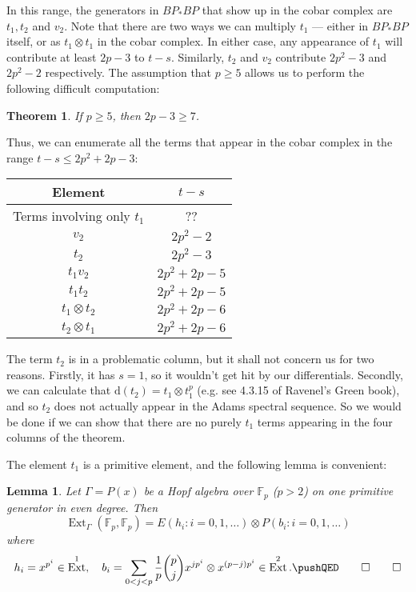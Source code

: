 \documentclass{shortart}
\newtheorem*{thm}{Theorem}
\newtheorem*{lemma}{Lemma}
\theoremstyle{definition}
\newcommand\dd{\mathrm{d}}
\newcommand\F{\mathbb{F}}
\DeclareMathOperator\Ext{Ext}
\begin{document}
In this range, the generators in $BP_*BP$ that show up in the cobar complex are $t_1, t_2$ and $v_2$. Note that there are two ways we can multiply $t_1$ --- either in $BP_* BP$ itself, or as $t_1 \otimes t_1$ in the cobar complex. In either case, any appearance of $t_1$ will contribute at least $2p - 3$ to $t - s$. Similarly, $t_2$ and $v_2$ contribute $2p^2 - 3$ and $2p^2 - 2$ respectively. The assumption that $p \geq 5$ allows us to perform the following difficult computation:

\begin{thm}
  If $p \geq 5$, then $2p - 3 \geq 7$.\fakeqed
\end{thm}

Thus, we can enumerate all the terms that appear in the cobar complex in the range $t - s \leq 2p^2 + 2p - 3$:
\begin{center}
  \begin{tabular}{cc}
    \toprule
    Element & $t - s$\\
    \midrule
    Terms involving only $t_1$ & ?? \\
    $v_2$ & $2p^2 - 2$\\
    $t_2$ & $2p^2 - 3$\\
    $t_1 v_2$ & $2p^2 + 2p - 5$\\
    $t_1 t_2$ & $2p^2 + 2p - 5$ \\
    $t_1 \otimes t_2$ & $2p^2 + 2p - 6$\\
    $t_2 \otimes t_1$ & $2p^2 + 2p - 6$\\
    \bottomrule
  \end{tabular}
\end{center}

The term $t_2$ is in a problematic column, but it shall not concern us for two reasons. Firstly, it has $s = 1$, so it wouldn't get hit by our differentials. Secondly, we can calculate that $\dd (t_2) = t_1 \otimes t_1^p$ (e.g. see 4.3.15 of Ravenel's Green book), and so $t_2$ does not actually appear in the Adams spectral sequence. So we would be done if we can show that there are no purely $t_1$ terms appearing in the four columns of the theorem.

The element $t_1$ is a primitive element, and the following lemma is convenient:
\begin{lemma}
  Let $\Gamma = P(x)$ be a Hopf algebra over $\F_p$ ($p > 2$) on one primitive generator in even degree. Then
  \[
    \Ext_\Gamma(\F_p, \F_p) = E(h_i: i = 0, 1, \ldots) \otimes P(b_i: i = 0, 1, \ldots)
  \]
  where
  \[
    h_i = x^{p^i} \in \Ext^1,\quad b_i = \sum_{0 < j < p} \frac{1}{p} \binom{p}{j} x^{jp^i} \otimes x^{(p - j)p^i} \in \Ext^2.\fakeqed
  \]
\end{lemma}
\end{document}
